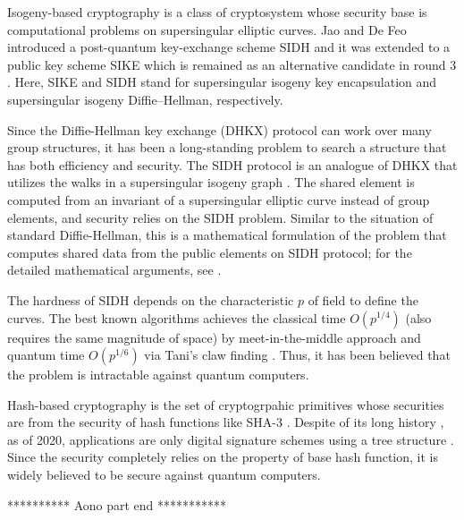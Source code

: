 Isogeny-based cryptography is a class of cryptosystem whose security base is computational problems on supersingular elliptic curves.
Jao and De Feo introduced a post-quantum key-exchange scheme SIDH \cite{JF11}
and it was extended to a public key scheme SIKE \cite{SIKEweb} which is remained as an alternative candidate in round 3 \cite{NISTpqround3}.
Here, SIKE and SIDH stand for supersingular isogeny key encapsulation
and supersingular isogeny Diffie–Hellman, respectively.

Since the Diffie-Hellman key exchange (DHKX) protocol can work over many group structures, it has been a long-standing problem to search a structure that has both efficiency and security.
The SIDH protocol is an analogue of DHKX that utilizes 
the walks in a supersingular isogeny graph \cite{JF11}.
The shared element is computed from an invariant of a supersingular elliptic curve instead of group elements,
and security relies on the SIDH problem.
Similar to the situation of standard Diffie-Hellman,
this is a mathematical formulation of the problem that computes 
shared data from the public elements on SIDH protocol;
for the detailed mathematical arguments, see \cite{Feo17,GV18}.

The hardness of SIDH depends on the characteristic $p$ of field to define the curves.
The best known algorithms achieves the classical time $O(p^{1/4})$ (also requires the same magnitude of space) by meet-in-the-middle approach \cite{GPST16,ACC+19} and quantum time $O(p^{1/6})$ via Tani's claw finding \cite{Tani09}.
Thus, it has been believed that the problem is intractable against quantum computers.

Hash-based cryptography is the set of cryptogrpahic primitives whose securities are from the security of hash functions like SHA-3 \cite{SHA3}.
Despite of its long history \cite{Lam79}, 
as of 2020, applications are only digital signature schemes using a tree structure \cite{BHH+15}.
Since the security completely relies on the property of base hash function, it is widely believed to be secure against quantum computers.

********** Aono part end ***********









